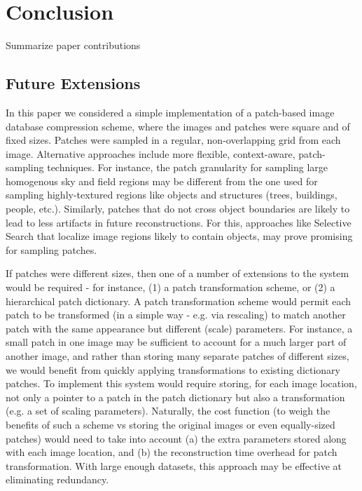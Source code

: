 \section{Conclusion}

\begin{edit}
Summarize paper contributions
\end{edit}





\subsection{Future Extensions}
\label{sec:futureext}

In this paper we considered a simple implementation of a patch-based image database compression scheme, where the images and patches were square and of fixed sizes. Patches were sampled in a regular, non-overlapping grid from each image.  Alternative approaches include more flexible, context-aware, patch-sampling techniques. For instance, the patch granularity for sampling large homogenous sky and field regions may be different from the one used for sampling highly-textured regions like objects and structures (trees, buildings, people, etc.). Similarly, patches that do not cross object boundaries are likely to lead to less artifacts in future reconstructions. For this, approaches like Selective Search \cite{UijlingsIJCV2013} that localize image regions likely to contain objects, may prove promising for sampling patches.

If patches were different sizes, then one of a number of extensions to the system would be required - for instance, (1) a patch transformation scheme, or (2) a hierarchical patch dictionary. A patch transformation scheme would permit each patch to be transformed (in a simple way - e.g. via rescaling) to match another patch with the same appearance but different (scale) parameters. For instance, a small patch in one image may be sufficient to account for a much larger part of another image, and rather than storing many separate patches of different sizes, we would benefit from quickly applying transformations to existing dictionary patches. To implement this system would require storing, for each image location, not only a pointer to a patch in the patch dictionary but also a transformation (e.g. a set of scaling parameters). Naturally, the cost function (to weigh the benefits of such a scheme vs storing the original images or even equally-sized patches) would need to take into account (a) the extra parameters stored along with each image location, and (b) the reconstruction time overhead for patch transformation. With large enough datasets, this approach may be effective at eliminating redundancy.

